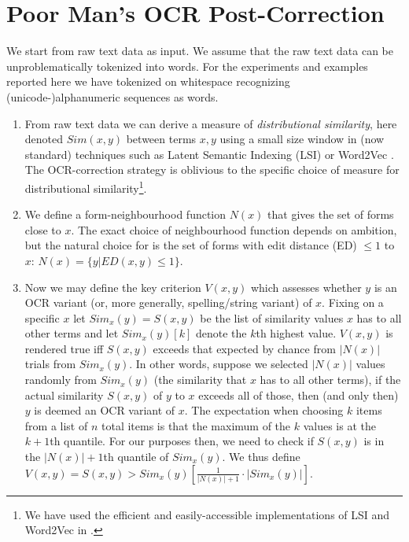 \documentclass{sig-alternate}
\begin{document}
\section{Poor Man's OCR Post-Correction}
\label{poorman}
We start from raw text data as input. We assume that the raw text data
can be unproblematically tokenized into words. For the experiments and
examples reported here we have tokenized on whitespace recognizing
(unicode-)alphanumeric sequences as words.

\begin{enumerate}
\item From raw text data we can derive a measure of
  \emph{distributional similarity}, here denoted $Sim(x,y)$ between
  terms $x,y$ using a small size window in (now standard) techniques
  such as Latent Semantic Indexing (LSI) \cite{cl:Deerwester} or
  Word2Vec \cite{cl:Mikolov:Words-Phrases}. The OCR-correction
  strategy is oblivious to the specific choice of measure for
  distributional similarity\footnote{We have used the efficient and
    easily-accessible implementations of LSI and Word2Vec in
    \cite{cl:Rehurek:Gensim}.}.

\item We define a form-neighbourhood function $N(x)$ that gives the
  set of forms close to $x$. The exact choice of neighbourhood
  function depends on ambition, but the natural choice for is the set
  of forms with edit distance (ED) $\leq 1$ to $x$: $N(x) = \{y|ED(x,y)
  \leq 1\}$.

\item Now we may define the key criterion $V(x,y)$ which assesses
  whether $y$ is an OCR variant (or, more generally, spelling/string
  variant) of $x$. Fixing on a specific $x$ let $Sim_x(y) = S(x, y)$
  be the list of similarity values $x$ has to all other terms and let
  $Sim_x(y)[k]$ denote the $k$th highest value. $V(x,y)$ is rendered
  true iff $S(x,y)$ exceeds that expected by chance from $|N(x)|$
  trials from $Sim_x(y)$. In other words, suppose we selected $|N(x)|$
  values randomly from $Sim_x(y)$ (the similarity that $x$ has to all
  other terms), if the actual similarity $S(x, y)$ of $y$ to $x$
  exceeds all of those, then (and only then) $y$ is deemed an OCR
  variant of $x$. The expectation when choosing $k$ items from a list
  of $n$ total items is that the maximum of the $k$ values is at the
  $k+1$th quantile. For our purposes then, we need to check if $S(x,
  y)$ is in the $|N(x)|+1$th quantile of $Sim_x(y)$.  We thus define
  $V(x,y) = S(x, y) > Sim_x(y)[\frac{1}{|N(x)|+1} \cdot
    |Sim_x(y)|]$.


\end{enumerate}
\end{document}
